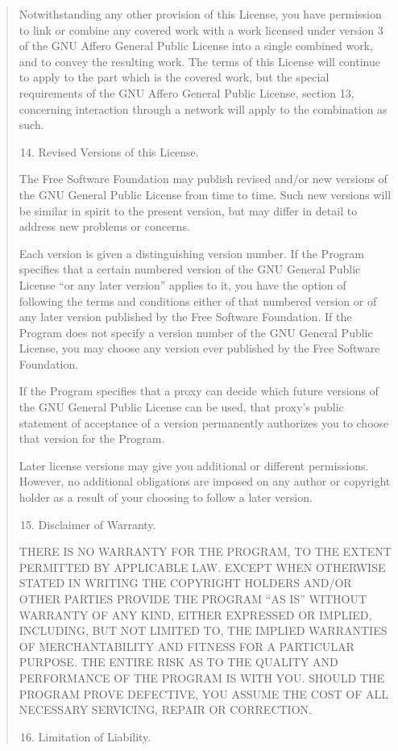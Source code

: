 \documentclass[letterpaper,10pt,english]{sphinxmanual}
\begin{document}
\begin{quote}
\begin{enumerate}
\end{enumerate}

Notwithstanding any other provision of this License, you have
permission to link or combine any covered work with a work licensed
under version 3 of the GNU Affero General Public License into a single
combined work, and to convey the resulting work.  The terms of this
License will continue to apply to the part which is the covered work,
but the special requirements of the GNU Affero General Public License,
section 13, concerning interaction through a network will apply to the
combination as such.
\begin{enumerate}
\setcounter{enumi}{13}
\item {} 
Revised Versions of this License.

\end{enumerate}

The Free Software Foundation may publish revised and/or new versions of
the GNU General Public License from time to time.  Such new versions will
be similar in spirit to the present version, but may differ in detail to
address new problems or concerns.

Each version is given a distinguishing version number.  If the
Program specifies that a certain numbered version of the GNU General
Public License ``or any later version'' applies to it, you have the
option of following the terms and conditions either of that numbered
version or of any later version published by the Free Software
Foundation.  If the Program does not specify a version number of the
GNU General Public License, you may choose any version ever published
by the Free Software Foundation.

If the Program specifies that a proxy can decide which future
versions of the GNU General Public License can be used, that proxy's
public statement of acceptance of a version permanently authorizes you
to choose that version for the Program.

Later license versions may give you additional or different
permissions.  However, no additional obligations are imposed on any
author or copyright holder as a result of your choosing to follow a
later version.
\begin{enumerate}
\setcounter{enumi}{14}
\item {} 
Disclaimer of Warranty.

\end{enumerate}

THERE IS NO WARRANTY FOR THE PROGRAM, TO THE EXTENT PERMITTED BY
APPLICABLE LAW.  EXCEPT WHEN OTHERWISE STATED IN WRITING THE COPYRIGHT
HOLDERS AND/OR OTHER PARTIES PROVIDE THE PROGRAM ``AS IS'' WITHOUT WARRANTY
OF ANY KIND, EITHER EXPRESSED OR IMPLIED, INCLUDING, BUT NOT LIMITED TO,
THE IMPLIED WARRANTIES OF MERCHANTABILITY AND FITNESS FOR A PARTICULAR
PURPOSE.  THE ENTIRE RISK AS TO THE QUALITY AND PERFORMANCE OF THE PROGRAM
IS WITH YOU.  SHOULD THE PROGRAM PROVE DEFECTIVE, YOU ASSUME THE COST OF
ALL NECESSARY SERVICING, REPAIR OR CORRECTION.
\begin{enumerate}
\setcounter{enumi}{15}
\item {} 
Limitation of Liability.


\end{enumerate}
\end{quote}
\end{document}
